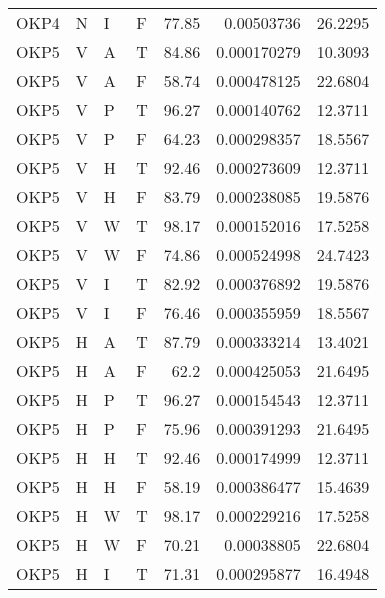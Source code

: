 \begin{longtable}{llllrrr}
    OKP4     & N         & I         & F          & 77.85      & 0.00503736  & 26.2295  \\
    OKP5     & V         & A         & T          & 84.86      & 0.000170279 & 10.3093  \\
    OKP5     & V         & A         & F          & 58.74      & 0.000478125 & 22.6804  \\
    OKP5     & V         & P         & T          & 96.27      & 0.000140762 & 12.3711  \\
    OKP5     & V         & P         & F          & 64.23      & 0.000298357 & 18.5567  \\
    OKP5     & V         & H         & T          & 92.46      & 0.000273609 & 12.3711  \\
    OKP5     & V         & H         & F          & 83.79      & 0.000238085 & 19.5876  \\
    OKP5     & V         & W         & T          & 98.17      & 0.000152016 & 17.5258  \\
    OKP5     & V         & W         & F          & 74.86      & 0.000524998 & 24.7423  \\
    OKP5     & V         & I         & T          & 82.92      & 0.000376892 & 19.5876  \\
    OKP5     & V         & I         & F          & 76.46      & 0.000355959 & 18.5567  \\
    OKP5     & H         & A         & T          & 87.79      & 0.000333214 & 13.4021  \\
    OKP5     & H         & A         & F          & 62.2       & 0.000425053 & 21.6495  \\
    OKP5     & H         & P         & T          & 96.27      & 0.000154543 & 12.3711  \\
    OKP5     & H         & P         & F          & 75.96      & 0.000391293 & 21.6495  \\
    OKP5     & H         & H         & T          & 92.46      & 0.000174999 & 12.3711  \\
    OKP5     & H         & H         & F          & 58.19      & 0.000386477 & 15.4639  \\
    OKP5     & H         & W         & T          & 98.17      & 0.000229216 & 17.5258  \\
    OKP5     & H         & W         & F          & 70.21      & 0.00038805  & 22.6804  \\
    OKP5     & H         & I         & T          & 71.31      & 0.000295877 & 16.4948  \\

\end{longtable}
